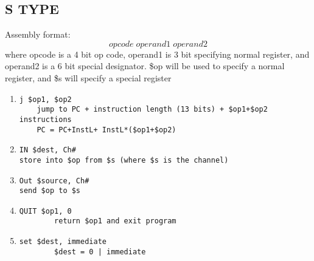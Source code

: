 \documentclass{article}
\begin{document}
\subsection{S TYPE}
Assembly format: \[opcode \;operand1 \;operand2\]
where opcode is a 4 bit op code, operand1 is 3 bit specifying normal register, and operand2 is a 6 bit special designator.
\$op will be used to specify a normal register, and \$s will specify a special register

\begin{enumerate}[resume]
\item
\begin{verbatim}
j $op1, $op2
    jump to PC + instruction length (13 bits) + $op1+$op2 instructions
    PC = PC+InstL+ InstL*($op1+$op2)

\end{verbatim}
\item
\begin{verbatim}
IN $dest, Ch#
store into $op from $s (where $s is the channel)

\end{verbatim}
\item
\begin{verbatim}
Out $source, Ch#
send $op to $s

\end{verbatim}
\item
\begin{verbatim}
QUIT $op1, 0
        return $op1 and exit program

\end{verbatim}
\item
\begin{verbatim}
set $dest, immediate
        $dest = 0 | immediate
\end{verbatim}
\end{enumerate}
\end{document}
